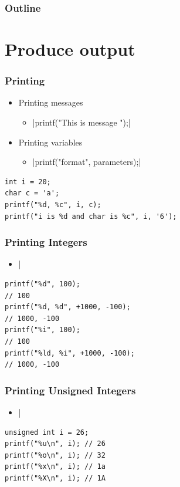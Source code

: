 \documentclass{../c-lecture}
\subtitle{Interaction}
\begin{document}
\begin{frame}
  \titlepage{}
\end{frame}
\begin{frame}
  \frametitle{Outline}
  \tableofcontents{}
\end{frame}

\section{Produce output}

\begin{frame}[fragile]
  \frametitle{Printing}
  \begin{itemize}
    \item Printing messages
    \begin{itemize}
      \item {}|printf("This is message \n");|
    \end{itemize}
    \item Printing variables
    \begin{itemize}
      \item {}|printf("format", parameters);|
    \end{itemize}
  \end{itemize}
  \begin{verbatim}
int i = 20;
char c = 'a';
printf("%d, %c", i, c);
printf("i is %d and char is %c", i, '6');
  \end{verbatim}
\end{frame}

\begin{frame}[fragile]
  \frametitle{Printing Integers}
  \begin{itemize}
    \item {}|%
  \end{itemize}
  \begin{verbatim}
printf("%d", 100);
// 100
printf("%d, %d", +1000, -100);
// 1000, -100
printf("%i", 100);
// 100
printf("%ld, %i", +1000, -100);
// 1000, -100
  \end{verbatim}
\end{frame}

\begin{frame}[fragile]
  \frametitle{Printing Unsigned Integers}
  \begin{itemize}
    \item {}|%
  \end{itemize}
  \begin{verbatim}
unsigned int i = 26;
printf("%u\n", i); // 26
printf("%o\n", i); // 32
printf("%x\n", i); // 1a
printf("%X\n", i); // 1A
  \end{verbatim}
\end{frame}
\end{document}
